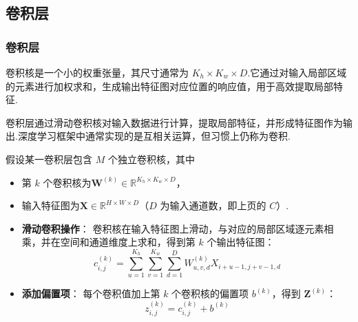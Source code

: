 \documentclass{模版}
\begin{document}
\subsection{卷积层}
\begin{frame}\frametitle{卷积层}
\begin{mydefinition}[卷积核]
    卷积核是一个小的权重张量，其尺寸通常为 $K_h \times K_w \times D$.它通过对输入局部区域的元素进行加权求和，生成输出特征图对应位置的响应值，用于高效提取局部特征.
\end{mydefinition}
\begin{mydefinition}[卷积层]
    卷积层通过滑动卷积核对输入数据进行计算，提取局部特征，并形成特征图作为输出.深度学习框架中通常实现的是互相关运算，但习惯上仍称为卷积.
\end{mydefinition}
    假设某一卷积层包含 $M$ 个独立卷积核，其中
    \begin{itemize}
        \item 第 $k$ 个卷积核为$\symbf{W}^{(k)} \in \mathbb{R}^{K_h \times K_w \times D}$，
        \item 输入特征图为$\symbf{X} \in \mathbb{R}^{H \times W \times D}$（$D$ 为输入通道数，即上页的 $C$）.
    \end{itemize}
\begin{itemize}
    \item \textbf{滑动卷积操作}：
卷积核在输入特征图上滑动，与对应的局部区域逐元素相乘，并在空间和通道维度上求和，得到第 $k$ 个输出特征图：
    \[
    c_{i,j}^{(k)} = \sum_{u=1}^{K_h} \sum_{v=1}^{K_w} \sum_{d=1}^{D}
    W_{u,v,d}^{(k)} X_{i+u-1,j+v-1,d}
    \]

    \item \textbf{添加偏置项}：
每个卷积值加上第 $k$ 个卷积核的偏置项 $b^{(k)}$，得到 $\symbf{Z}^{(k)}$：
        \[
        z_{i,j}^{(k)} = c_{i,j}^{(k)} + b^{(k)}
        \]


\end{itemize}
\end{frame}
\end{document}
